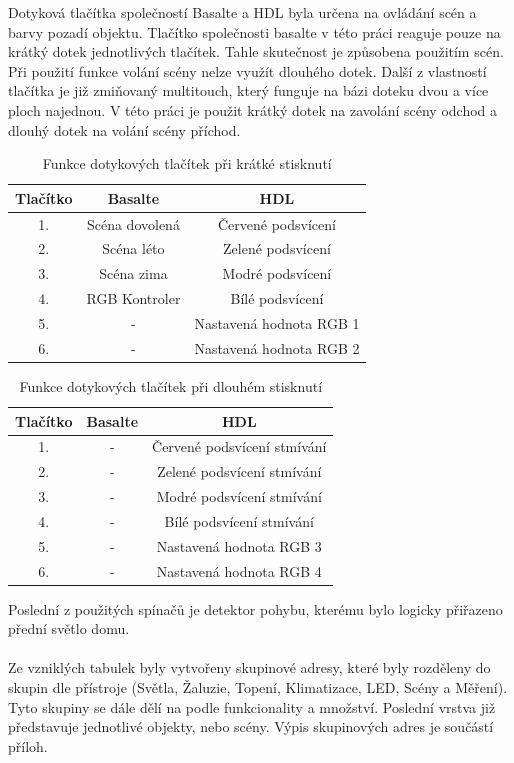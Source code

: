 Dotyková tlačítka společností Basalte a HDL byla určena na ovládání scén a barvy pozadí objektu. Tlačítko společnosti basalte v této práci reaguje pouze na  krátký dotek jednotlivých tlačítek. Tahle skutečnost je způsobena použitím scén. Při použití funkce volání scény nelze využít dlouhého dotek. Další z vlastností tlačítka je již zmiňovaný multitouch, který funguje na bázi doteku dvou a více ploch najednou. V této práci je použit krátký dotek na zavolání scény odchod a dlouhý dotek na volání scény příchod.
\newpage
\begin{table}[!ht]
 \caption[Funkce dotykových tlačítek při krátké stisknutí]{Funkce dotykových tlačítek při krátké stisknutí}
   \small
    \centering
	  \begin{tabular}{|c|c|c|}
	    \hline
	    Tlačítko & Basalte & HDL \\
	    \hline\hline
	    1. & Scéna dovolená  & Červené podsvícení \\
	    \hline
        2. & Scéna léto  &  Zelené podsvícení \\
	    \hline
        3. & Scéna zima  & Modré podsvícení   \\
	    \hline
        4. & RGB Kontroler & Bílé podsvícení \\
	    \hline
        5. & - & Nastavená hodnota RGB 1 \\
	    \hline 
        6. & - &  Nastavená hodnota RGB 2 \\
	    \hline 
	  \end{tabular}
\end{table}

\begin{table}[!ht]
 \caption[Funkce dotykových tlačítek při dlouhém stisknutí]{Funkce dotykových tlačítek při dlouhém stisknutí}
   \small
    \centering
	  \begin{tabular}{|c|c|c|}
	    \hline
	    Tlačítko & Basalte & HDL  \\
	    \hline\hline
	    1. & - & Červené podsvícení stmívání  \\
	    \hline
        2. & - & Zelené podsvícení stmívání \\
	    \hline
        3. & - & Modré podsvícení stmívání  \\
	    \hline
        4. & - & Bílé podsvícení  stmívání \\
	    \hline
        5. & - & Nastavená hodnota RGB 3 \\
	    \hline 
        6. & - & Nastavená hodnota RGB 4 \\
	    \hline 
	  \end{tabular}
\end{table}

Poslední z použitých spínačů je detektor pohybu, kterému bylo logicky přiřazeno přední světlo domu.\\ \\Ze vzniklých tabulek byly vytvořeny skupinové adresy, které byly rozděleny do skupin dle přístroje (Světla, Žaluzie, Topení, Klimatizace, LED, Scény a Měření). Tyto skupiny se dále dělí na podle funkcionality a množství. Poslední vrstva již představuje jednotlivé objekty, nebo scény. Výpis skupinových adres je součástí příloh.